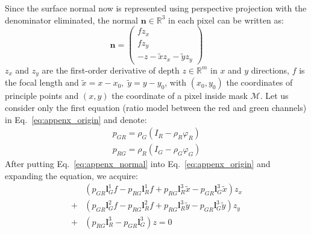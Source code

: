 Since the surface normal now is represented using perspective projection with the denominator eliminated, the normal $\mathbf{n}\in\mathbb{R}^{3}$ in each pixel can be written as:
\begin{equation}\label{eq:appenx_normal}
    \mathbf{n} =
     \begin{pmatrix}
         fz_x\\
         fz_y\\
         -z - \tilde{x}z_x - \tilde{y}z_y
     \end{pmatrix}
\end{equation}
$z_x$ and $z_y$ are the first-order derivative of depth $z\in\mathbb{R}^m$ in $x$ and $y$ directions, $f$ is the focal length and $\tilde{x}=x- x_0,\; \tilde{y}= y - y_0$, with $(x_0, y_0)$ the coordinates of principle points and $(x,y)$ the coordinate of a pixel inside mask $\mathcal{M}$. Let us consider only the first equation (ratio model between the red and green channels) in Eq.~\ref{eq:appenx_origin} and denote:
\begin{equation}
    \begin{split}
        p_{GR} =  \rho_G (I_R -\rho_R \varphi_R)\\
        p_{RG} =  \rho_R (I_G -\rho_G \varphi_G)
    \end{split}
\end{equation}
After putting Eq.~\ref{eq:appenx_normal} into Eq.~\ref{eq:appenx_origin} and expanding the equation, we acquire:
\begin{equation}\label{eq:appenx_perpixel}
    \begin{split}
        &(p_{GR} \mathbf{l}_G^1 f - p_{RG} \mathbf{l}_R^1 f + p_{RG}\mathbf{l}_R^3 \tilde{x} - p_{GR}\mathbf{l}_G^3 \tilde{x})z_x\\
        +&(p_{GR} \mathbf{l}_G^2 f - p_{RG} \mathbf{l}_R^2 f + p_{RG}\mathbf{l}_R^3 \tilde{y} - p_{GR}\mathbf{l}_G^3 \tilde{y})z_y\\
        +& (p_{RG}\mathbf{l}_R^3 - p_{GR}\mathbf{l}_G^3)z = 0
    \end{split}
\end{equation}
